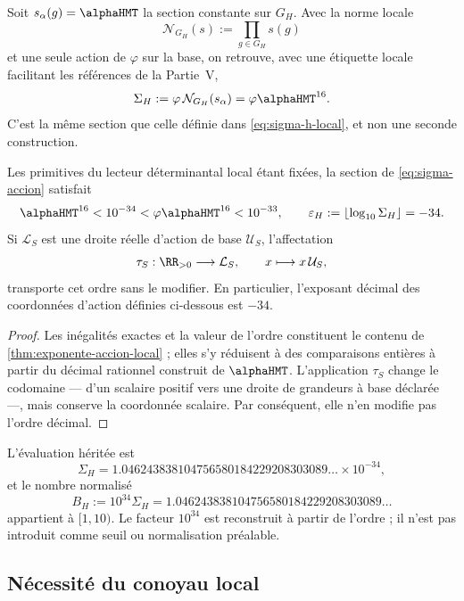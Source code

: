 Soit \(s_\alpha(g)=\alphaHMT\) la section constante sur \(G_H\). Avec la
norme locale
\[
\mathcal N_{G_H}(s):=\prod_{g\in G_H}s(g)
\]
et une seule action de \(\varphi\) sur la base, on retrouve, avec une
étiquette locale facilitant les références de la Partie~V,
\begin{equation}
\label{eq:sigma-accion}
\Sigma_H
:=\varphi\,\mathcal N_{G_H}(s_\alpha)
=\varphi\alphaHMT^{16}.
\end{equation}
C'est la même section que celle définie dans \cref{eq:sigma-h-local}, et non une seconde
construction.

\begin{theorem}
\label{thm:orden-accion}
Les primitives du lecteur déterminantal local étant fixées, la section de
\cref{eq:sigma-accion} satisfait
\[
\alphaHMT^{16}<10^{-34}
<\varphi\alphaHMT^{16}<10^{-33},
\qquad
\varepsilon_H:=\left\lfloor\log_{10}\Sigma_H\right\rfloor=-34.
\]
Si \(\mathcal L_S\) est une droite réelle d'action de base
\(\mathcal U_S\), l'affectation
\[
\tau_S:\RR_{>0}\longrightarrow\mathcal L_S,
\qquad x\longmapsto x\,\mathcal U_S,
\]
transporte cet ordre sans le modifier. En particulier, l'exposant décimal
des coordonnées d'action définies ci-dessous est \(-34\).
\end{theorem}

\begin{proof}
Les inégalités exactes et la valeur de l'ordre constituent le contenu de
\cref{thm:exponente-accion-local} ; elles s'y réduisent à des comparaisons entières à
partir du décimal rationnel construit de \(\alphaHMT\). L'application
\(\tau_S\) change le codomaine --- d'un scalaire positif vers une droite de
grandeurs à base déclarée ---, mais conserve la coordonnée scalaire. Par
conséquent, elle n'en modifie pas l'ordre décimal.
\end{proof}

L'évaluation héritée est
\[
\Sigma_H
=1.046243838104756580184229208303089\ldots\times10^{-34},
\]
et le nombre normalisé
\[
B_H:=10^{34}\Sigma_H
=1.046243838104756580184229208303089\ldots
\]
appartient à \([1,10)\). Le facteur \(10^{34}\) est reconstruit à partir de
l'ordre ; il n'est pas introduit comme seuil ou normalisation préalable.

\subsection{Nécessité du conoyau local}

